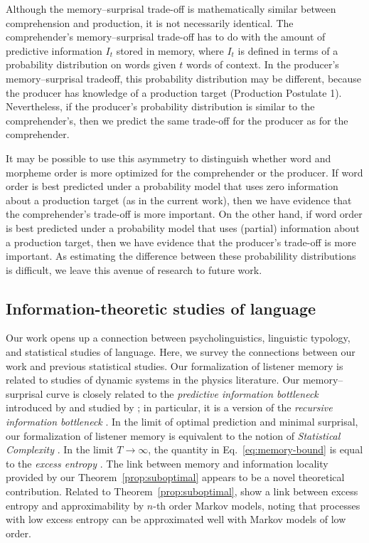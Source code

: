 Although the memory--surprisal trade-off is mathematically similar between comprehension and production, it is not necessarily identical. The comprehender's memory--surprisal trade-off has to do with the amount of predictive information $I_t$ stored in memory, where $I_t$ is defined in terms of a probability distribution on words given $t$ words of context. In the producer's memory--surprisal tradeoff, this probability distribution may be different, because the producer has knowledge of a production target (Production Postulate 1). Nevertheless, if the producer's probability distribution is similar to the comprehender's, then we predict the same trade-off for the producer as for the comprehender.

It may be possible to use this asymmetry to distinguish whether word and morpheme order is more optimized for the comprehender or the producer. If word order is best predicted under a probability model that uses zero information about a production target (as in the current work), then we have evidence that the comprehender's trade-off is more important. On the other hand, if word order is best predicted under a probability model that uses (partial) information about a production target, then we have evidence that the producer's trade-off is more important. As estimating the difference between these probabilility distributions is difficult, we leave this avenue of research to future work.

\subsection{Information-theoretic studies of language}

Our work opens up a connection between psycholinguistics, linguistic typology, and statistical studies of language. Here, we survey the connections between our work and previous statistical studies.
Our formalization of listener memory is related to studies of dynamic systems in the physics literature.
Our memory--surprisal curve is closely related to the \emph{predictive information bottleneck} introduced by \citet{still-information-2014} and studied by \citet{marzen-predictive-2016}; in particular, it is a version of the \emph{recursive information bottleneck} \citep[][\S 4]{still-information-2014}. 
In the limit of optimal prediction and minimal surprisal, our formalization of listener memory is equivalent to the notion of \emph{Statistical Complexity} \citep{crutchfield-inferring-1989}.
In the limit $T \rightarrow \infty$, the quantity in Eq.~\ref{eq:memory-bound} is equal to the \emph{excess entropy} \citep{crutchfield-inferring-1989}.
The link between memory and information locality provided by our Theorem~\ref{prop:suboptimal} appears to be a novel theoretical contribution.
Related to Theorem~\ref{prop:suboptimal}, \citet{sharan-prediction-2016} show a link between excess entropy and approximability by $n$-th order Markov models, noting that processes with low excess entropy can be approximated well with Markov models of low order.

